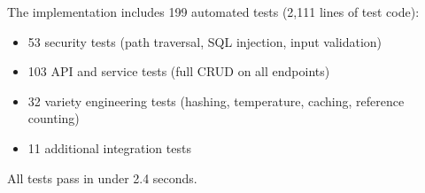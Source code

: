 \documentclass[11pt]{article}
\begin{document}
The implementation includes 199 automated tests (2,111 lines of test code):
\begin{itemize}[nosep]
  \item 53 security tests (path traversal, SQL injection, input validation)
  \item 103 API and service tests (full CRUD on all endpoints)
  \item 32 variety engineering tests (hashing, temperature, caching, reference counting)
  \item 11 additional integration tests
\end{itemize}

All tests pass in under 2.4 seconds.
\end{document}
